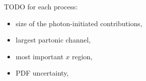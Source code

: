 \noindent

TODO for each process:
\begin{itemize}
\item size of the photon-initiated contributions,
\item largest partonic channel,
\item most important $x$ region,
\item PDF uncertainty,
\end{itemize}



